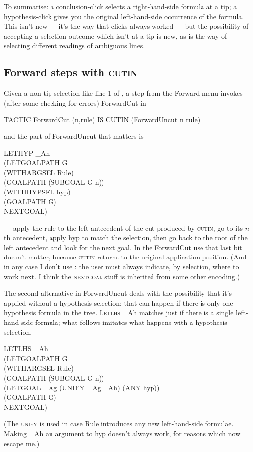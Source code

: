 To summarise: a conclusion-click selects a right-hand-side formula at a tip; a hypothesis-click gives you the original left-hand-side occurrence of the formula. This isn't new --- it's the way that clicks always worked --- but the possibility of accepting a selection outcome which isn't at a tip is new, as is the way of selecting different readings of ambiguous lines.

\subsection{Forward steps with \textsc{cutin}}
\label{sec:I2L:forwardCUTIN}

Given a non-tip selection like line 1 of , a step from the Forward menu invokes (after some checking for errors) ForwardCut in 
\begin{japeish}
TACTIC ForwardCut (n,rule) IS CUTIN (ForwardUncut n rule)
\end{japeish}
and the part of ForwardUncut that matters is
\begin{japeish}
LETHYP \_Ah \\
\tab (LETGOALPATH G \\
\tab \tab (WITHARGSEL Rule) \\
\tab \tab (GOALPATH (SUBGOAL G n)) \\
\tab \tab (WITHHYPSEL hyp) \\
\tab \tab (GOALPATH G) \\
\tab \tab NEXTGOAL)
\end{japeish}
--- apply the rule to the left antecedent of the cut produced by \textsc{cutin}, go to its $n$th antecedent, apply hyp to match the selection, then go back to the root of the left antecedent and look for the next goal. In the ForwardCut use that last bit doesn't matter, because \textsc{cutin} returns to the original application position. (And in any case I don't use : the user must always indicate, by selection, where to work next. I think the \textsc{nextgoal} stuff is inherited from some other encoding.)

The second alternative in ForwardUncut deals with the possibility that it's applied without a hypothesis selection: that can happen if there is only one hypothesis formula in the tree. \textsc{Letlhs} \_Ah matches just if there is a single left-hand-side formula; what follows imitates what happens with a hypothesis selection.
\begin{japeish}
LETLHS \_Ah \\
\tab (LETGOALPATH G \\
\tab \tab (WITHARGSEL Rule)\\
\tab \tab (GOALPATH (SUBGOAL G n))\\
\tab \tab (LETGOAL \_Ag (UNIFY \_Ag \_Ah) (ANY hyp))\\
\tab \tab (GOALPATH G) \\
\tab \tab NEXTGOAL)
\end{japeish}
(The \textsc{unify} is used in case Rule introduces any new left-hand-side formulae. Making \_Ah an argument to hyp doesn't always work, for reasons which now escape me.)

